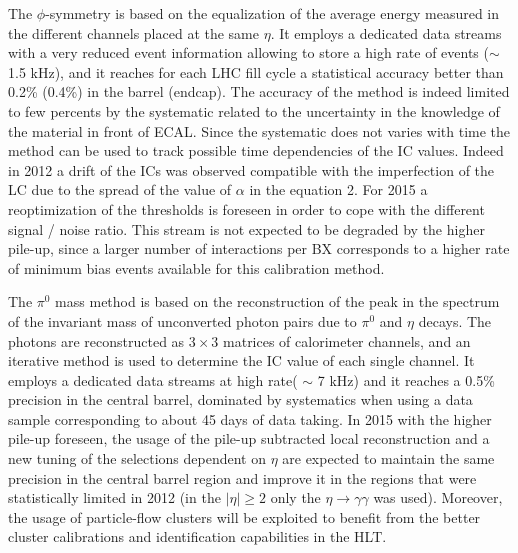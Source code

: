 \documentclass[journal]{IEEEtran}
\begin{document}
The $\phi$-symmetry is based on the equalization of the average energy measured in the different channels placed at the same $\eta$. It employs a dedicated data streams with a very reduced event information allowing to store a high rate of events ($\sim$ 1.5 kHz), and it reaches for each LHC fill cycle a statistical accuracy better than 0.2\% (0.4\%) in the barrel (endcap). The accuracy of the method is indeed limited to few percents by the systematic related to the uncertainty in the knowledge of the material in front of ECAL. Since the systematic does not varies with time the method can be used to track possible time dependencies of the IC values. Indeed in 2012 a drift of the ICs was observed compatible with the imperfection of the LC due to the spread of the value of $\alpha$ in the equation 2. For 2015 a reoptimization of the thresholds is foreseen in order to cope with the different signal / noise ratio. This stream is not expected to be degraded by the higher pile-up, since a larger number of interactions per BX corresponds to a higher rate of minimum bias events available for this calibration method.

The $\pi^0$ mass method is based on the reconstruction of the peak in the spectrum of the invariant mass of unconverted photon pairs due to $\pi^0$ and $\eta$ decays. The photons are reconstructed as $3 \times 3$ matrices of calorimeter channels, and an iterative method is used to determine the IC value of each single channel. It employs a dedicated data streams at high rate( $\sim$ 7 kHz) and it reaches a 0.5\% precision in the central barrel, dominated by systematics when using a data sample corresponding to about 45 days of data taking. In 2015 with the higher pile-up foreseen, the usage of the pile-up subtracted local reconstruction and a new tuning of the selections dependent on $\eta$ are expected to maintain the same precision in the central barrel region and improve it in the regions that were statistically limited in 2012 (in the $\vert\eta\vert\ge2$ only the $\eta\to\gamma\gamma$ was used). Moreover, the usage of particle-flow clusters \cite{CMS:2010eua} will be exploited to benefit from the better cluster calibrations and identification capabilities in the HLT.
\end{document}
